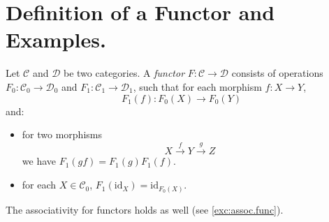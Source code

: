 \documentclass[11pt]{article}
\theoremstyle{plain}
\theoremstyle{definition}
\theoremstyle{remark}
\newcommand{\cC}{\mathcal{C}}
\newcommand{\cD}{\mathcal{D}}
\newcommand{\id}{\mathrm{id}}
\begin{document}
\section{Definition of a Functor and Examples.}

\begin{definition}[Functor]
Let $\cC$ and $\cD$ be two categories. A {\em functor} 
$F:\cC\to\cD$ consists of operations $F_{0}:\cC_{0}\to\cD_{0}$
and $F_{1}:\cC_{1}\to\cD_{1}$, such that for each morphism
$f:X\to Y$,
\begin{equation*}
    F_{1}(f):F_{0}(X)\to F_{0}(Y)
\end{equation*}
and:
\begin{itemize}
    \item for two morphisms
    \begin{equation*}
        X\xrightarrow{f}Y\xrightarrow{g}Z
    \end{equation*}
    we have $F_{1}(gf)=F_{1}(g)F_{1}(f)$.
    \item for each $X\in\cC_{0}$,
    $F_{1}(\id_{X})=\id_{F_{0}(X)}$.
\end{itemize}
\end{definition}


\begin{note}\label{note:associativityfunc}
The associativity for functors holds as well (see \autoref{exc:assoc.func}).
\end{note}
\end{document}

